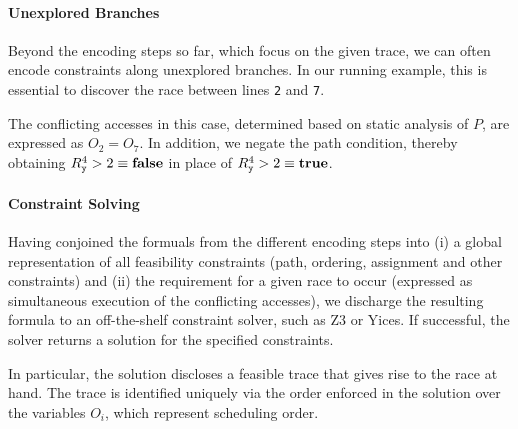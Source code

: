 \paragraph{Unexplored Branches} Beyond the encoding steps so far, which focus on the given trace, we can often encode constraints along unexplored branches. In our running example, this is essential to discover the race between lines {\tt 2} and {\tt 7}. 

The conflicting accesses in this case, determined based on static analysis of $P$, are expressed as $O_2=O_7$. In addition, we negate the path condition, thereby obtaining $R_{\tt y}^4 > 2 \equiv {\bf false}$ in place of $R_{\tt y}^4 > 2 \equiv {\bf true}$. 

\paragraph{Constraint Solving} Having conjoined the formuals from the different encoding steps into (i) a global representation of all feasibility constraints (path, ordering, assignment and other constraints) and (ii) the requirement for a given race to occur (expressed as simultaneous execution of the conflicting accesses), we discharge the resulting formula to an off-the-shelf constraint solver, such as Z3 or Yices. If successful, the solver returns a solution for the specified constraints. 

In particular, the solution discloses a feasible trace that gives rise to the race at hand. The trace is identified uniquely via the order enforced in the solution over the variables $O_i$, which represent scheduling order. 
